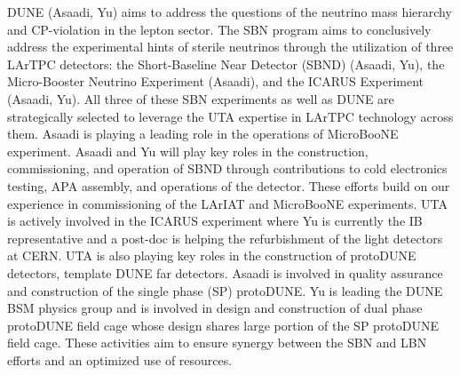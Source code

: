  
DUNE (Asaadi, Yu) aims to address the questions of the neutrino mass hierarchy and CP-violation in the lepton sector. The SBN program aims to conclusively address the experimental hints of sterile neutrinos through the utilization of three LArTPC detectors: the Short-Baseline Near Detector (SBND) (Asaadi, Yu), the Micro-Booster Neutrino Experiment (Asaadi), and the ICARUS Experiment (Asaadi, Yu). All three of these SBN experiments as well as DUNE are strategically selected to leverage the UTA expertise in LArTPC technology across them.
Asaadi is playing a leading role in the operations of MicroBooNE experiment. Asaadi and Yu will play key roles in the construction, commissioning, and operation of SBND through contributions to cold electronics testing, APA assembly, and operations of the detector. These efforts build on our experience in commissioning of the LArIAT and MicroBooNE experiments. UTA is actively involved in the ICARUS experiment where Yu is currently the IB representative and a post-doc is helping the refurbishment of the light detectors at CERN.  UTA is also playing key roles in the construction of protoDUNE detectors, template DUNE far detectors. Asaadi is involved in quality assurance and construction of the single phase (SP) protoDUNE. Yu is leading the DUNE BSM physics group and is involved in design and construction of dual phase protoDUNE field cage whose design shares large portion of the SP protoDUNE field cage. These activities aim to ensure synergy between the SBN and LBN efforts and an optimized use of resources.




